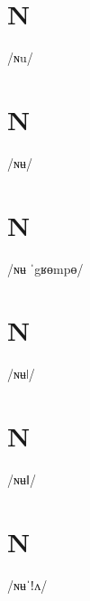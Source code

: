 \documentclass[10pt,a4paper,twoside]{book}
\begin{document}
\section*{N}

\begin{multicols}{3}
 {/ɴu/} {}
\end{multicols}

\section*{N}

\begin{multicols}{3}
 {/ɴʉ/} {}
\end{multicols}

\section*{N}

\begin{multicols}{3}
 {/ɴʉ ˈgʁɵmpɵ/} {}
\end{multicols}

\section*{N}

\begin{multicols}{3}
 {/ɴʉǀ/} {}
\end{multicols}

\section*{N}

\begin{multicols}{3}
 {/ɴʉǁ/} {}
\end{multicols}

\section*{N}

\begin{multicols}{3}
 {/ɴʉˈǃʌ/} {}
\end{multicols}
\end{document}
